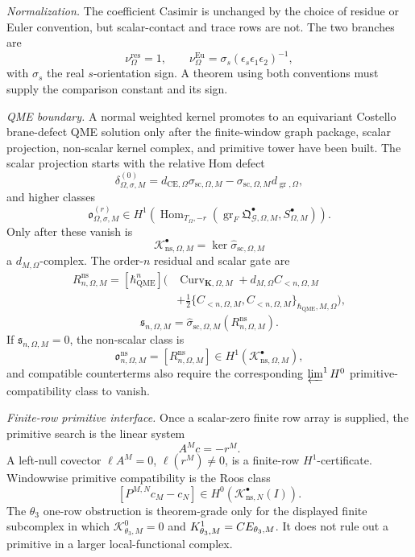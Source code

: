 \begin{stmt}
  \emph{Normalization.} The coefficient Casimir is unchanged by the
  choice of residue or Euler convention, but scalar-contact and trace
  rows are not.  The two branches are
  \[
    \nu_\Omega^{\mathrm{res}}=1,\qquad
    \nu_\Omega^{\mathrm{Eu}}
    =
    \sigma_s(\epsilon_s\epsilon_1\epsilon_2)^{-1},
  \]
  with \(\sigma_s\) the real \(s\)-orientation sign.  A theorem using
  both conventions must supply the comparison constant and its sign.

  \emph{QME boundary.} A normal weighted kernel promotes to an
  equivariant Costello brane-defect QME solution only after the
  finite-window graph package, scalar projection, non-scalar kernel
  complex, and primitive tower have been built.  The scalar projection
  starts with the relative Hom defect
  \[
    \delta^{(0)}_{\Omega,\sigma,M}
    =
    d_{\mathrm{CE},\Omega}\sigma_{\mathrm{sc},\Omega,M}
    -\sigma_{\mathrm{sc},\Omega,M}d_{\operatorname{gr},\Omega},
  \]
  and higher classes
  \[
    \mathfrak o^{(r)}_{\Omega,\sigma,M}
    \in
    H^1\!\left(
      \operatorname{Hom}_{T_\Omega,-r}
      (\operatorname{gr}_{F}\mathfrak Q^\bullet_{\mathcal G,\Omega,M},
       S^\bullet_{\Omega,M})
    \right).
  \]
  Only after these vanish is
  \[
    \mathcal K^\bullet_{\mathrm{ns},\Omega,M}
    =
    \ker\widehat\sigma_{\mathrm{sc},\Omega,M}
  \]
  a \(d_{M,\Omega}\)-complex.  The order-\(n\) residual and scalar gate
  are
  \[
  \begin{aligned}
    R^{\mathrm{ns}}_{n,\Omega,M}
      =
    [\hbar_{\mathrm{QME}}^n]\bigl(
      &\operatorname{Curv}_{\mathbf K,\Omega,M}
      +d_{M,\Omega}C_{<n,\Omega,M}\\
      &+\frac12
      \{C_{<n,\Omega,M},C_{<n,\Omega,M}\}_{\hbar_{\mathrm{QME}},M,\Omega}
    \bigr),
  \end{aligned}
  \]
  \[
    \mathfrak s_{n,\Omega,M}
    =
    \widehat\sigma_{\mathrm{sc},\Omega,M}
    (R^{\mathrm{ns}}_{n,\Omega,M}).
  \]
  If \(\mathfrak s_{n,\Omega,M}=0\), the non-scalar class is
  \[
    \mathfrak o^{\mathrm{ns}}_{n,\Omega,M}
    =
    [R^{\mathrm{ns}}_{n,\Omega,M}]
    \in H^1(\mathcal K^\bullet_{\mathrm{ns},\Omega,M}),
  \]
  and compatible counterterms also require the corresponding
  \(\varprojlim^1H^0\) primitive-compatibility class to vanish.

  \emph{Finite-row primitive interface.} Once a scalar-zero finite row
  array is supplied, the primitive search is the linear system
  \[
    A^M c=-r^M.
  \]
  A left-null covector \(\ell A^M=0\), \(\ell(r^M)\ne0\), is a
  finite-row \(H^1\)-certificate.  Windowwise primitive compatibility is
  the Roos class
  \[
    [P^{M,N}c_M-c_N]\in
    H^0(\mathcal K^\bullet_{\mathrm{ns},N}(I)).
  \]
  The \(\theta_3\) one-row obstruction is theorem-grade only for the
  displayed finite subcomplex in which
  \(\mathcal K^0_{\theta_3,M}=0\) and
  \(K^1_{\theta_3,M}=CE_{\theta_3,M}\).  It does not
  rule out a primitive in a larger local-functional complex.


\end{stmt}

